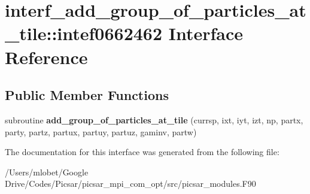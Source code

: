 \hypertarget{interfaceinterf__add__group__of__particles__at__tile_1_1intef0662462}{}\section{interf\+\_\+add\+\_\+group\+\_\+of\+\_\+particles\+\_\+at\+\_\+tile\+:\+:intef0662462 Interface Reference}
\label{interfaceinterf__add__group__of__particles__at__tile_1_1intef0662462}
\subsection*{Public Member Functions}
\begin{DoxyCompactItemize}
\item 
subroutine {\bfseries add\+\_\+group\+\_\+of\+\_\+particles\+\_\+at\+\_\+tile} (currsp, ixt, iyt, izt, np, partx, party, partz, partux, partuy, partuz, gaminv, partw)\hypertarget{interfaceinterf__add__group__of__particles__at__tile_1_1intef0662462_ad8cb0ff2eab917a15ce127c3a4677c07}{}\label{interfaceinterf__add__group__of__particles__at__tile_1_1intef0662462_ad8cb0ff2eab917a15ce127c3a4677c07}

\end{DoxyCompactItemize}


The documentation for this interface was generated from the following file\+:\begin{DoxyCompactItemize}
\item 
/\+Users/mlobet/\+Google Drive/\+Codes/\+Picsar/picsar\+\_\+mpi\+\_\+com\+\_\+opt/src/picsar\+\_\+modules.\+F90\end{DoxyCompactItemize}
